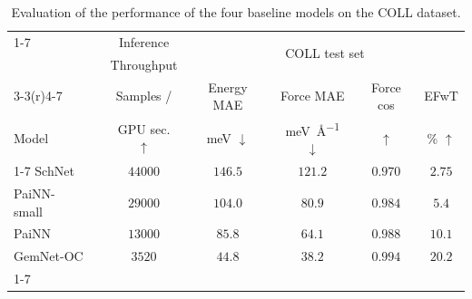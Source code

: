 \begin{table}[h]
\centering
\caption{Evaluation of the performance of the four baseline models on the COLL dataset.}
\begin{tabular}{lcccccc}
\cmidrule(r){1-7}
\multicolumn{1}{c}{\multirow{4}{*}{}} & & Inference & \multicolumn{4}{c}{\multirow{2}{*}{COLL test set}} 
\\
\multicolumn{1}{c}{} & & Throughput & \multicolumn{4}{c}{}
\\\cmidrule(r){3-3}\cmidrule(r){4-7}
\multicolumn{1}{c}{}   &   &               Samples /      &      Energy MAE  &    Force MAE  & Force cos & EFwT  \\
  \multicolumn{1}{l}{Model}     &   &         GPU sec. $\uparrow$          &      \si{\milli\electronvolt} $\downarrow$   &    \si{\milli\electronvolt\per\angstrom} $\downarrow$     & $\uparrow$  & \% $\uparrow$  \\\cmidrule(r){1-7}
SchNet             &   &           $44000$          &   $146.5$        &   $121.2$     &   $0.970$      &   $2.75$ \\
PaiNN-small              &  &        $29000$             &    $104.0$      &     $80.9$     &  $0.984$ &  $5.4$  \\
PaiNN              &   &        $13000$             &   $85.8$        &   $64.1$     &   $0.988$      &   $10.1$ \\
GemNet-OC            &  &           $3520$          &    $44.8$        &   $38.2$     &   $0.994$      &   $20.2$  \\\cmidrule(r){1-7}
\end{tabular}
\label{tab:coll_baselines}
\end{table}

\raggedbottom